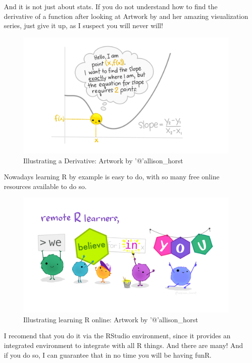 \documentclass[
]{book}
\begin{document}
And it is not just about stats. If you do not understand how to find the derivative of a function after looking at Artwork by \citet{allison_horst} and her amazing visualization series, just give it up, as I suspect you will never will!

\begin{figure}
\centering
\includegraphics{extfiles/derivative_1.jpg}
\caption{Illustrating a Derivative: Artwork by '@'allison\_horst}
\end{figure}

Nowadays learning R by example is easy to do, with so many free online resources available to do so.

\begin{figure}
\centering
\includegraphics{extfiles/monster_support.jpg}
\caption{Illustrating learning R online: Artwork by '@'allison\_horst}
\end{figure}

I recomend that you do it via the RStudio environment, since it provides an integrated environment to integrate with all R things. And there are many! And if you do so, I can guarantee that in no time you will be having funR.
\end{document}
